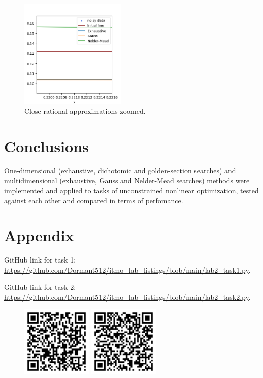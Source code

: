 \documentclass[12pt, a4paper]{article}
\begin{document}
\begin{figure}[!h]
\centering
\includegraphics[width=0.45\textwidth]{rational2.png}
\caption{Close rational approximations zoomed.}
\end{figure}

\section*{Conclusions}

One-dimensional (exhaustive, dichotomic and golden-section searches) and multidimensional (exhaustive, Gauss and Nelder-Mead searches) methods were implemented and applied to tasks of unconstrained nonlinear optimization, tested against each other and compared in terms of perfomance.

\newpage

\section*{Appendix}

GitHub link for task 1: \url{https://github.com/Dormant512/itmo_lab_listings/blob/main/lab2_task1.py}.

GitHub link for task 2: \url{https://github.com/Dormant512/itmo_lab_listings/blob/main/lab2_task2.py}.

\begin{figure}[!h]
\centering
\includegraphics[width=0.3\textwidth]{lab2task1.png}
\includegraphics[width=0.3\textwidth]{lab2task2.png}
\end{figure}
\end{document}
